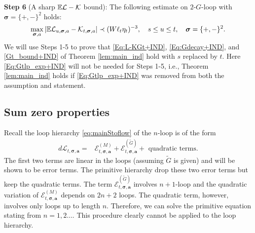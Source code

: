 \documentclass[10pt,reqno]{article}
\theoremstyle{plain} %
\theoremstyle{remark}
\numberwithin{equation}{section}
\begin{document}
\bigskip
\noindent 
\textbf{Step 6} (A sharp  $\mathbb E \cal L - \cal K$  bound): 
The following estimate on $2$-$G$-loop with $\boldsymbol{\sigma}=\{+,-\}^2$ holds: 
\begin{equation}\label{Eq:Gtlp_exp_flow}
 \max_{\boldsymbol{\sigma}, \textbf{a}}\left|\mathbb E{\cal L}_{u, \boldsymbol{\sigma}, \textbf{a}}-{\cal K}_{t, \boldsymbol{\sigma}, \textbf{a}}\right|\prec (W\ell_t\eta_t)^{-3},\quad  
 s \le u \le t, \quad\boldsymbol{\sigma}=\{+,-\}^2.
\end{equation}
We will use Steps 1-5 to  prove  that \eqref{Eq:L-KGt+IND}, \eqref{Eq:Gdecay+IND}, and \eqref{Gt_bound+IND} of Theorem \ref{lem:main_ind} hold with $s$ replaced by $t$. Here \eqref{Eq:Gtlp_exp+IND} will not be needed for Steps 1-5, i.e.,  Theorem \ref{lem:main_ind}  holds if \eqref{Eq:Gtlp_exp+IND} was removed from both the assumption and statement. 


 

 



 

\subsection{Sum zero properties} %
 





 


Recall the loop hierarchy \eqref{eq:mainStoflow} of the $n$-loop  is of the form 
\begin{align}
    d\mathcal{L}_{t, \boldsymbol{\sigma}, \textbf{a}} =&
    \mathcal{E}^{(M)}_{t, \boldsymbol{\sigma}, \textbf{a}} 
    +
    \mathcal{E}^{(\widetilde{G})}_{t, \boldsymbol{\sigma}, \textbf{a}} 
    + \mbox{ quadratic terms} . 
\end{align}
The first two terms are linear in the loops (assuming $\tilde G$ is given) and will be shown to be error terms. The primitive hierarchy drop these two error terms but keep the quadratic terms.  The  term $  \mathcal{E}^{(\widetilde{G})}_{t, \boldsymbol{\sigma}, \textbf{a}} $  involves $n+1$-loop and the quadratic variation of  $ \mathcal{E}^{(M)}_{t, \boldsymbol{\sigma}, \textbf{a}} $ depends on $2n+2$ loops.  The quadratic term, however,  involves only loops up to length $n$.  Therefore, we can solve the primitive equation stating from $n=1, 2 \ldots$. This procedure clearly cannot be applied to the loop hierarchy. 
\end{document}
